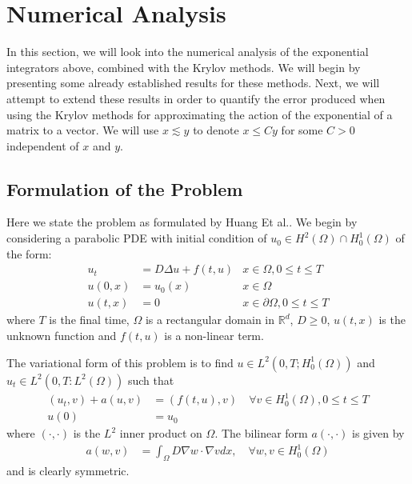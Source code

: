 \section{Numerical Analysis}

In this section, we will look into the numerical analysis of the exponential integrators above, combined with the Krylov methods.
We will begin by presenting some already established results for these methods.
Next, we will attempt to extend these results in order to quantify the error produced when using the Krylov methods for approximating the action of the exponential of a matrix to a vector.
We will use $x \lesssim y$ to denote $x \leq C y$ for some $C>0$ independent of $x$ and $y$.
\subsection{Formulation of the Problem}
Here we state the problem as formulated by Huang Et al.\cite{Huang2022}.
We begin by considering a parabolic PDE with initial condition of $u_0 \in H^2(\Omega) \cap H^1_0(\Omega)$ of the form:
\begin{align*}
    u_t &= D \Delta u + f(t,u) &x\in \Omega, 0 \leq t \leq T\\
    u(0,x) &= u_0(x) &x\in \Omega\\
    u(t,x) &= 0 &x\in \partial \Omega, 0 \leq t \leq T
\end{align*}
where $T$ is the final time, $\Omega$ is a rectangular domain in $\mathbb{R}^d$, $D\geq 0$, $u(t,x)$ is the unknown function and $f(t,u)$ is a non-linear term.

The variational form of this problem is to find $u\in L^2(0,T;H^1_0(\Omega))$ and $u_t \in L^2(0,T: L^2(\Omega))$ such that
\begin{align*}
    (u_t, v) + a(u, v) &= (f(t,u),v) \quad \forall v \in H^1_0(\Omega), 0\leq t \leq T\\
    u(0) &= u_0
\end{align*}
where $(\cdot,\cdot)$ is the $L^2$ inner product on $\Omega$.
The bilinear form $a(\cdot,\cdot)$ is given by
\begin{align*}
    a(w,v) &= \int_{\Omega} D \nabla w \cdot \nabla v dx, \quad \forall w, v \in H^1_0(\Omega)
\end{align*}
and is clearly symmetric.

